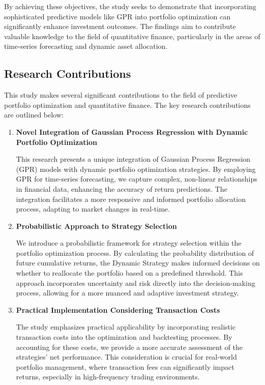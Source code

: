 By achieving these objectives, the study seeks to demonstrate that incorporating sophisticated predictive models like GPR into portfolio optimization can significantly enhance investment outcomes. The findings aim to contribute valuable knowledge to the field of quantitative finance, particularly in the areas of time-series forecasting and dynamic asset allocation.

\subsection{Research Contributions}

This study makes several significant contributions to the field of predictive portfolio optimization and quantitative finance. The key research contributions are outlined below:

\begin{enumerate}
    \item \textbf{Novel Integration of Gaussian Process Regression with Dynamic Portfolio Optimization}

    This research presents a unique integration of Gaussian Process Regression (GPR) models with dynamic portfolio optimization strategies. By employing GPR for time-series forecasting, we capture complex, non-linear relationships in financial data, enhancing the accuracy of return predictions. The integration facilitates a more responsive and informed portfolio allocation process, adapting to market changes in real-time.

    \item \textbf{Probabilistic Approach to Strategy Selection}

    We introduce a probabilistic framework for strategy selection within the portfolio optimization process. By calculating the probability distribution of future cumulative returns, the Dynamic Strategy makes informed decisions on whether to reallocate the portfolio based on a predefined threshold. This approach incorporates uncertainty and risk directly into the decision-making process, allowing for a more nuanced and adaptive investment strategy.

    \item \textbf{Practical Implementation Considering Transaction Costs}

    The study emphasizes practical applicability by incorporating realistic transaction costs into the optimization and backtesting processes. By accounting for these costs, we provide a more accurate assessment of the strategies' net performance. This consideration is crucial for real-world portfolio management, where transaction fees can significantly impact returns, especially in high-frequency trading environments.


\end{enumerate}
